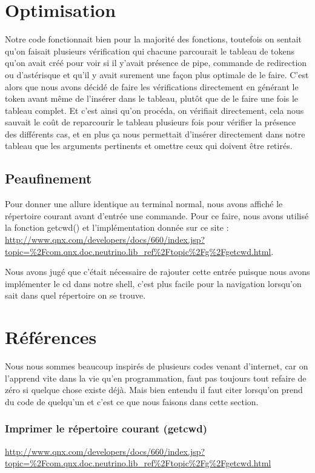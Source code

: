 \documentclass{article}
\begin{document}
\section{Optimisation}
Notre code fonctionnait bien pour la majorité des fonctions, toutefois on sentait qu'on faisait plusieurs vérification qui chacune parcourait le tableau de tokens qu'on avait créé pour voir si il y'avait présence de pipe, commande de redirection ou d'astérisque et qu'il y avait surement une façon plus optimale de le faire. C'est alors que nous avons décidé de faire les vérifications directement en générant le token avant même de l'insérer dans le tableau, plutôt que de le faire une fois le tableau complet. Et c'est ainsi qu'on procéda, on vérifiait directement, cela nous sauvait le coût de reparcourir le tableau plusieurs fois pour vérifier la présence des différents cas, et en plus ça nous permettait d'insérer directement dans notre tableau que les arguments pertinents et omettre ceux qui doivent être retirés.

\subsection{Peaufinement}
Pour donner une allure identique au terminal normal, nous avons affiché le répertoire courant avant d'entrée une commande. Pour ce faire, nous avons utilisé la fonction getcwd() et l'implémentation donnée sur ce site : \url{http://www.qnx.com/developers/docs/660/index.jsp?topic=%2Fcom.qnx.doc.neutrino.lib_ref%2Ftopic%2Fg%2Fgetcwd.html}. 

Nous avons jugé que c'était nécessaire de rajouter cette entrée puisque nous avons implémenter le cd dans notre shell, c'est plus facile pour la navigation lorsqu'on sait dans quel répertoire on se trouve.

\section{Références}
Nous nous sommes beaucoup inspirés de plusieurs codes venant d'internet, car on l'apprend vite dans la vie qu'en programmation, faut pas toujours tout refaire de zéro si quelque chose existe déjà. Mais bien entendu il faut citer lorsqu'on prend du code de quelqu'un et c'est ce que nous faisons dans cette section.

\subsubsection*{Imprimer le répertoire courant (getcwd)}
 \url{http://www.qnx.com/developers/docs/660/index.jsp?topic=%2Fcom.qnx.doc.neutrino.lib_ref%2Ftopic%2Fg%2Fgetcwd.html}
\end{document}
